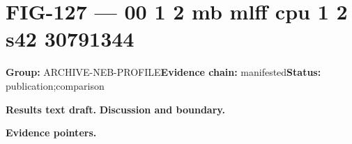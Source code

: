 \clearpage
\section{FIG-127 --- 00 1 2 mb mlff cpu 1 2 s42 30791344}
\label{figpage:fig-127}
\textbf{Group:} ARCHIVE-NEB-PROFILE\quad \textbf{Evidence chain:} manifested\quad \textbf{Status:} publication;comparison

\textbf{Results text draft.} 
\textbf{Discussion and boundary.} 


\textbf{Evidence pointers.}



\vfill
